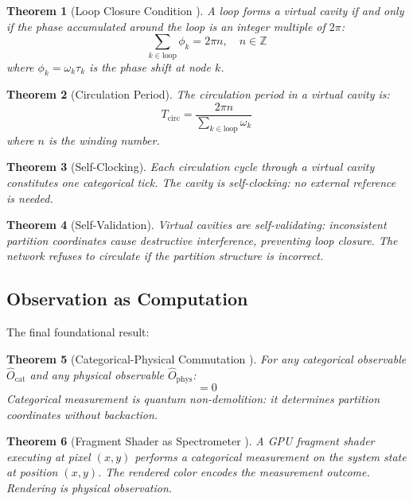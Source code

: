 \documentclass[11pt,a4paper]{article}
\newtheorem{theorem}{Theorem}[section]
\begin{document}
\begin{theorem}[Loop Closure Condition \cite{Paper10}]
A loop forms a virtual cavity if and only if the phase accumulated around the loop is an integer multiple of $2\pi$:
\begin{equation}
\sum_{k \in \text{loop}} \phi_k = 2\pi n, \quad n \in \mathbb{Z}
\end{equation}
where $\phi_k = \omega_k \tau_k$ is the phase shift at node $k$.
\end{theorem}

\begin{theorem}[Circulation Period]
The circulation period in a virtual cavity is:
\begin{equation}
T_{\text{circ}} = \frac{2\pi n}{\sum_{k \in \text{loop}} \omega_k}
\end{equation}
where $n$ is the winding number.
\end{theorem}

\begin{theorem}[Self-Clocking]
Each circulation cycle through a virtual cavity constitutes one categorical tick. The cavity is self-clocking: no external reference is needed.
\end{theorem}

\begin{theorem}[Self-Validation]
Virtual cavities are self-validating: inconsistent partition coordinates cause destructive interference, preventing loop closure. The network refuses to circulate if the partition structure is incorrect.
\end{theorem}

\subsection{Observation as Computation}

The final foundational result:

\begin{theorem}[Categorical-Physical Commutation \cite{Paper8}]
For any categorical observable $\hat{O}_{\text{cat}}$ and any physical observable $\hat{O}_{\text{phys}}$:
\begin{equation}
[\hat{O}_{\text{cat}}, \hat{O}_{\text{phys}}] = 0
\end{equation}
Categorical measurement is quantum non-demolition: it determines partition coordinates without backaction.
\end{theorem}

\begin{theorem}[Fragment Shader as Spectrometer \cite{Paper8}]
A GPU fragment shader executing at pixel $(x,y)$ performs a categorical measurement on the system state at position $(x,y)$. The rendered color encodes the measurement outcome. Rendering is physical observation.
\end{theorem}
\end{document}
